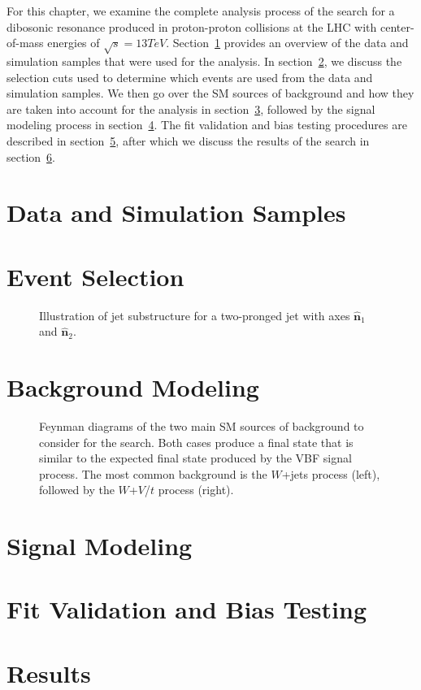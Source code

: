 For this chapter, we examine the complete analysis process of the search for a dibosonic resonance produced in proton-proton collisions at the LHC with center-of-mass energies of $\sqrt{s}=13\unit{TeV}$.
Section~\ref{sec:samples} provides an overview of the data and simulation samples that were used for the analysis.
In section~\ref{sec:events}, we discuss the selection cuts used to determine which events are used from the data and simulation samples.
We then go over the SM sources of background and how they are taken into account for the analysis in section~\ref{sec:bkg}, followed by the signal modeling process in section~\ref{sec:sig}.
The fit validation and bias testing procedures are described in section~\ref{sec:bias}, after which we discuss the results of the search in section~\ref{sec:results}.

\section{Data and Simulation Samples}
\label{sec:samples}

\section{Event Selection}
\label{sec:events}

\begin{figure}[htbp]
  \centering
  
  \caption{Illustration of jet substructure for a two-pronged jet with axes $\mathbf{\hat{n}}_1$ and $\mathbf{\hat{n}}_2$.}
  \label{fig:jet}
\end{figure}

\section{Background Modeling}
\label{sec:bkg}

\begin{figure}[htbp]
  \centering
  
  \caption{Feynman diagrams of the two main SM sources of background to consider for the search. Both cases produce a final state that is similar to the expected final state produced by the VBF signal process. The most common background is the $W$+jets process (left), followed by the $W$+$V$/$t$ process (right).}
  \label{fig:bkgFeynman}
\end{figure}

\section{Signal Modeling}
\label{sec:sig}

\section{Fit Validation and Bias Testing}
\label{sec:bias}

\section{Results}
\label{sec:results}
